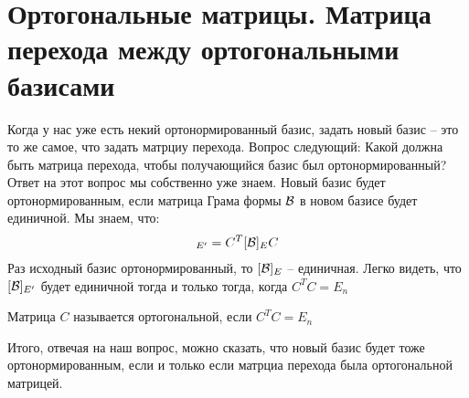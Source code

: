 \section{Ортогональные матрицы. Матрица перехода между ортогональными базисами}
Когда у нас уже есть некий ортонормированный базис, задать новый базис -- это то же самое, что задать матрциу перехода. Вопрос следующий: Какой должна быть 
матрица перехода, чтобы получающийся базис был ортонормированный? Ответ на этот вопрос мы собственно уже знаем.  
Новый базис будет ортонормированным, если матрица Грама формы $\mathcal{B}$ в новом базисе будет единичной. Мы знаем, что: 
\begin{gather*}
    [\B]_{E'} =C^T [\B]_E C
\end{gather*}
Раз исходный базис ортонормированный, то $[\mathcal{B}]_E$ -- единичная. Легко видеть, что $[\mathcal{B}]_{E'}$ будет единичной тогда и только тогда, когда $C^T C = E_n$ 
\begin{conj}
    Матрица $C$ называется ортогональной, если $C^T C = E_n$ 
\end{conj}
Итого, отвечая на наш вопрос, можно сказать, что новый базис будет тоже ортонормированным, если и только если матрциа перехода была ортогональной матрицей.

